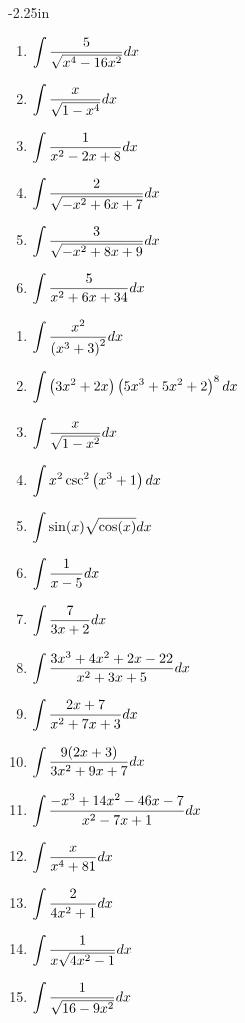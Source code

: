 \clearpage

\begin{adjustwidth*}{}{-2.25in}
\setlength{\columnsep}{25pt}
\begin{multicols*}{2}\small

\begin{enumerate}[1),start=42]
\item $\displaystyle \int \frac{5}{\sqrt{x^4-16 x^2}} dx $
\item $\displaystyle \int \frac{x}{\sqrt{1-x^4}} dx $
\item $\displaystyle \int \frac{1}{x^2-2 x+8} dx $
\item $\displaystyle \int \frac{2}{\sqrt{-x^2+6 x+7}} dx $
\item $\displaystyle \int \frac{3}{\sqrt{-x^2+8 x+9}} dx $
\item $\displaystyle \int \frac{5}{x^2+6 x+34} dx $
\end{enumerate}

\vspace{.25cm}


\begin{enumerate}[1),resume]
\item $\displaystyle \int \frac{x^2}{\left(x^3+3\right)^2} dx $
\item $\displaystyle \int \left(3 x^2+2 x\right) \left(5 x^3+5 x^2+2\right)^8 dx $
\item $\displaystyle \int \frac{x}{\sqrt{1-x^2}} dx $
\item $\displaystyle \int x^2 \csc ^2\left(x^3+1\right) dx $
\item $\displaystyle \int \sin (x) \sqrt{\cos (x)} dx $
\item $\displaystyle \int \frac{1}{x-5} dx $
\item $\displaystyle \int \frac{7}{3 x+2} dx $
\item $\displaystyle \int \frac{3 x^3+4 x^2+2 x-22}{x^2+3 x+5} dx $
\item $\displaystyle \int \frac{2 x+7}{x^2+7 x+3} dx $
\item $\displaystyle \int \frac{9 (2 x+3)}{3 x^2+9 x+7} dx $
\item $\displaystyle \int \frac{-x^3+14 x^2-46 x-7}{x^2-7 x+1} dx $
\item $\displaystyle \int \frac{x}{x^4+81} dx $
\item $\displaystyle \int \frac{2}{4 x^2+1} dx $
\item $\displaystyle \int \frac{1}{x \sqrt{4 x^2-1}} dx $
\item $\displaystyle \int \frac{1}{\sqrt{16-9 x^2}} dx $


\end{enumerate}
\end{multicols*}
\end{adjustwidth*}
